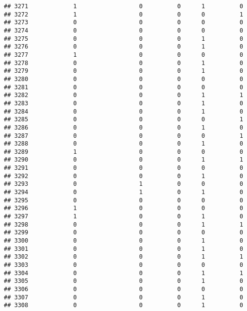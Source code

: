 \documentclass[
]{article}
\begin{document}
\begin{verbatim}
## 3271             1                  0          0      1          0
## 3272             1                  0          0      0          1
## 3273             0                  0          0      0          0
## 3274             0                  0          0      0          0
## 3275             0                  0          0      1          0
## 3276             0                  0          0      1          0
## 3277             1                  0          0      0          0
## 3278             0                  0          0      1          0
## 3279             0                  0          0      1          0
## 3280             0                  0          0      0          0
## 3281             0                  0          0      0          0
## 3282             0                  0          0      1          1
## 3283             0                  0          0      1          0
## 3284             0                  0          0      1          0
## 3285             0                  0          0      0          1
## 3286             0                  0          0      1          0
## 3287             0                  0          0      0          1
## 3288             0                  0          0      1          0
## 3289             1                  0          0      0          0
## 3290             0                  0          0      1          1
## 3291             0                  0          0      0          0
## 3292             0                  0          0      1          0
## 3293             0                  1          0      0          0
## 3294             0                  1          0      1          0
## 3295             0                  0          0      0          0
## 3296             1                  0          0      0          0
## 3297             1                  0          0      1          0
## 3298             0                  0          0      1          1
## 3299             0                  0          0      0          0
## 3300             0                  0          0      1          0
## 3301             0                  0          0      1          0
## 3302             0                  0          0      1          1
## 3303             0                  0          0      0          0
## 3304             0                  0          0      1          1
## 3305             0                  0          0      1          0
## 3306             0                  0          0      0          0
## 3307             0                  0          0      1          0
## 3308             0                  0          0      1          0

\end{verbatim}
\end{document}
